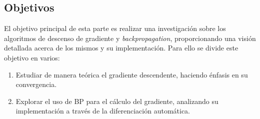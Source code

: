\subsection{Objetivos}

El objetivo principal de esta parte es realizar una investigación sobre los algoritmos de descenso de gradiente y \textit{backpropagation}, proporcionando una visión detallada acerca de los mismos y su implementación. Para ello se divide este objetivo en varios:

\begin{enumerate}

    
    \item Estudiar de manera teórica el gradiente descendente, haciendo énfasis en su convergencia.

    \item Explorar el uso de BP para el cálculo del gradiente, analizando su implementación a través de la diferenciación automática.


\end{enumerate}



